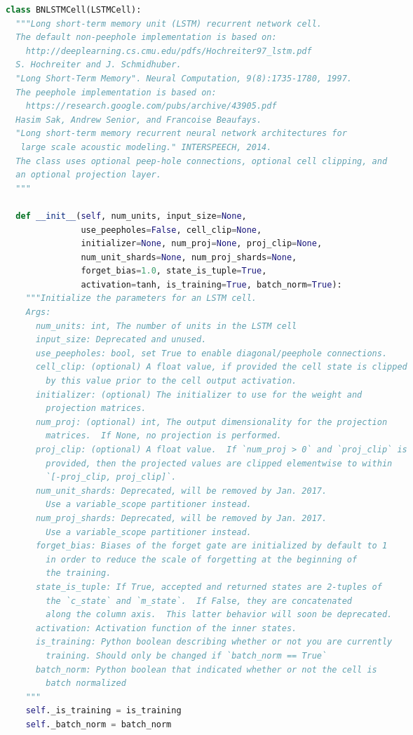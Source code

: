 \begin{landscape}
\begin{multicols}{2}
\begin{lstlisting}[language=Python]
class BNLSTMCell(LSTMCell):
  """Long short-term memory unit (LSTM) recurrent network cell.
  The default non-peephole implementation is based on:
    http://deeplearning.cs.cmu.edu/pdfs/Hochreiter97_lstm.pdf
  S. Hochreiter and J. Schmidhuber.
  "Long Short-Term Memory". Neural Computation, 9(8):1735-1780, 1997.
  The peephole implementation is based on:
    https://research.google.com/pubs/archive/43905.pdf
  Hasim Sak, Andrew Senior, and Francoise Beaufays.
  "Long short-term memory recurrent neural network architectures for
   large scale acoustic modeling." INTERSPEECH, 2014.
  The class uses optional peep-hole connections, optional cell clipping, and
  an optional projection layer.
  """

  def __init__(self, num_units, input_size=None,
               use_peepholes=False, cell_clip=None,
               initializer=None, num_proj=None, proj_clip=None,
               num_unit_shards=None, num_proj_shards=None,
               forget_bias=1.0, state_is_tuple=True,
               activation=tanh, is_training=True, batch_norm=True):
    """Initialize the parameters for an LSTM cell.
    Args:
      num_units: int, The number of units in the LSTM cell
      input_size: Deprecated and unused.
      use_peepholes: bool, set True to enable diagonal/peephole connections.
      cell_clip: (optional) A float value, if provided the cell state is clipped
        by this value prior to the cell output activation.
      initializer: (optional) The initializer to use for the weight and
        projection matrices.
      num_proj: (optional) int, The output dimensionality for the projection
        matrices.  If None, no projection is performed.
      proj_clip: (optional) A float value.  If `num_proj > 0` and `proj_clip` is
        provided, then the projected values are clipped elementwise to within
        `[-proj_clip, proj_clip]`.
      num_unit_shards: Deprecated, will be removed by Jan. 2017.
        Use a variable_scope partitioner instead.
      num_proj_shards: Deprecated, will be removed by Jan. 2017.
        Use a variable_scope partitioner instead.
      forget_bias: Biases of the forget gate are initialized by default to 1
        in order to reduce the scale of forgetting at the beginning of
        the training.
      state_is_tuple: If True, accepted and returned states are 2-tuples of
        the `c_state` and `m_state`.  If False, they are concatenated
        along the column axis.  This latter behavior will soon be deprecated.
      activation: Activation function of the inner states.
      is_training: Python boolean describing whether or not you are currently
        training. Should only be changed if `batch_norm == True`
      batch_norm: Python boolean that indicated whether or not the cell is
        batch normalized
    """
    self._is_training = is_training
    self._batch_norm = batch_norm


\end{lstlisting}
\end{multicols}
\end{landscape}
